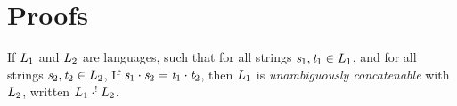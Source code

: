 \documentclass[numbers,10pt,preprint\ifanon ,nocopyrightspace\fi]{sigplanconf}
\begin{document}


\ifappendices



\onecolumn
\section{Proofs}

\begin{definition}
  If $L_1$ and $L_2$ are languages, such that
  for all strings $\mathit{s}_1,\mathit{t}_1 \in L_1$, and for all strings
  $\mathit{s}_2,\mathit{t}_2 \in L_2$, If $\mathit{s}_1\cdot\mathit{s}_2 =
  \mathit{t}_1\cdot\mathit{t}_2$, then $L_1$ is \textit{unambiguously
    concatenable} with $L_2$, written
  $L_1 \cdot^! L_2$.
\end{definition}
\end{document}
